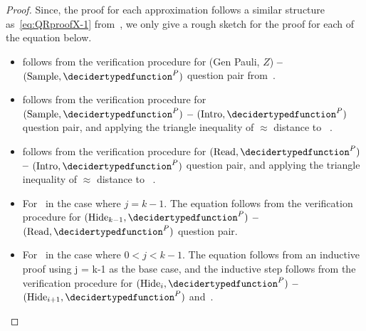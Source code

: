 \begin{proof}
	Since, the proof for each approximation follows a similar structure as~\eqref{eq:QRproofX-1} from~, we only give a rough sketch for the proof for each of the equation below.
	\begin{itemize}
		\item {} follows from the verification procedure for (Gen Pauli, $Z$) \textbf{--} $(\text{Sample}, \decidertypedfunction^{P})$ question pair from~. 
		\item {} follows from the verification procedure for $(\text{Sample}, \decidertypedfunction^{P})$ \textbf{--} $(\text{Intro},  \decidertypedfunction^{P})$ question pair, and applying the triangle inequality of $\approx$ distance to ~. 
		\item {} follows from the verification procedure for $(\text{Read},  \decidertypedfunction^{P})$ \textbf{--}  $(\text{Intro},  \decidertypedfunction^{P})$ question pair,  and applying the triangle inequality of $\approx$ distance to ~. 
		\item For~ in the case where $j  = k-1$. The equation follows from the verification procedure for  $(\text{Hide}_{k-1}, \decidertypedfunction^{P})$ \textbf{--}   $(\text{Read},  \decidertypedfunction^{P})$ question pair. 
		\item For~ in the case where $0<j  < k-1$. The equation follows from an inductive proof using j = k-1 as the base case, and the inductive step follows from the verification procedure for $(\text{Hide}_{i}, \decidertypedfunction^{P})$ \textbf{--}  $(\text{Hide}_{i+1}, \decidertypedfunction^{P})$ and~.
	\end{itemize}
\end{proof}


